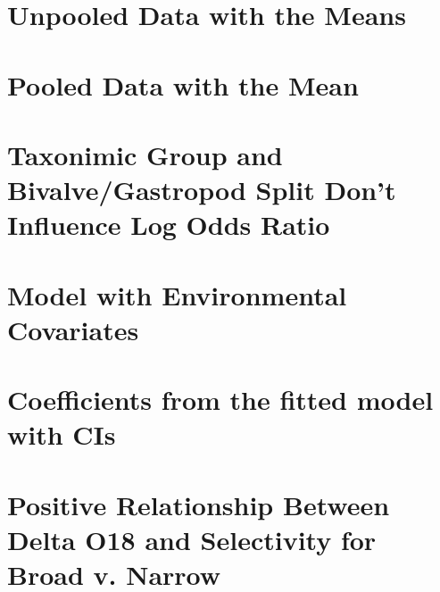 \documentclass{article}\usepackage{graphicx, color}
\begin{document}
\section{Unpooled Data with the Means}






\section{Pooled Data with the Mean}





\section{Taxonimic Group and Bivalve/Gastropod Split Don't Influence Log Odds Ratio}





\section{Model with Environmental Covariates}





\section{Coefficients from the fitted model with CIs}





\section{Positive Relationship Between Delta O18 and Selectivity for Broad v. Narrow}





\huge {}
\end{document}
